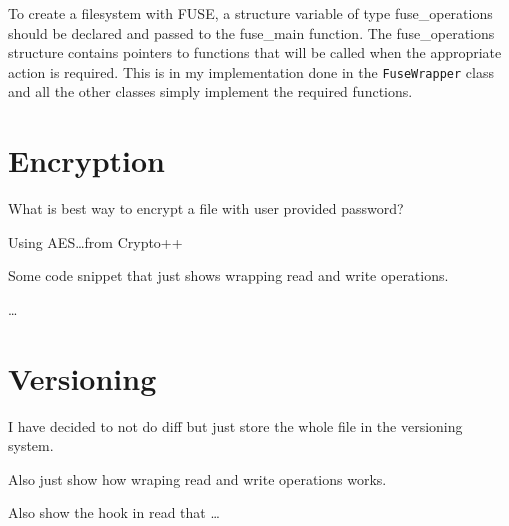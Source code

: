 To create a filesystem with FUSE, a structure variable of type fuse\_operations should be declared and passed to the fuse\_main function.
The fuse\_operations structure contains pointers to functions that will be called when the appropriate action is required.
This is in my implementation done in the \texttt{FuseWrapper} class and all the other classes simply implement the required functions.

\section{Encryption}\label{sec:encryption}


What is best way to encrypt a file with user provided password?

Using AES\ldots from Crypto++

Some code snippet that just shows wrapping read and write operations.

\ldots

\section{Versioning}\label{sec:versioning2}


I have decided to not do diff but just store the whole file in the versioning system.

Also just show how wraping read and write operations works.

Also show the hook in read that \ldots